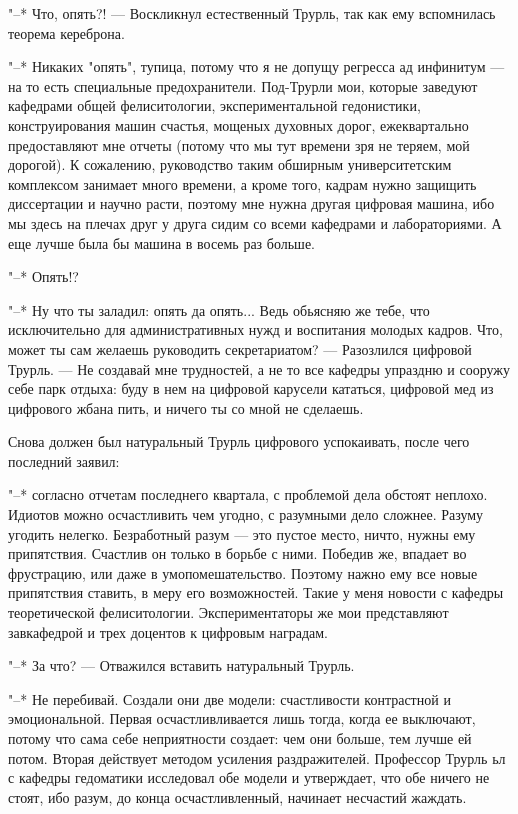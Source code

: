 "--* Что, опять?! --- Воскликнул естественный Трурль, так
как ему вспомнилась теорема кереброна.

"--* Никаких "опять", тупица, потому что я не допущу
регресса ад инфинитум --- на то есть специальные
предохранители. Под-Трурли мои, которые заведуют кафедрами
общей фелиситологии, экспериментальной гедонистики,
конструирования машин счастья, мощеных духовных дорог,
ежеквартально предоставляют мне отчеты (потому что мы тут
времени зря не теряем, мой дорогой). К сожалению,
руководство таким обширным университетским комплексом
занимает много времени, а кроме того, кадрам нужно защищить
диссертации и научно расти, поэтому мне нужна другая
цифровая машина, ибо мы здесь на плечах друг у друга сидим
со всеми кафедрами и лабораториями. А еще лучше была бы
машина в восемь раз больше.

"--* Опять!?

"--* Ну что ты заладил: опять да опять... Ведь обьясняю же
тебе, что исключительно для административных нужд и
воспитания молодых кадров. Что, может ты сам желаешь
руководить секретариатом? --- Разозлился цифровой Трурль. --- Не
создавай мне трудностей, а не то все кафедры упраздню и
сооружу себе парк отдыха: буду в нем на цифровой карусели
кататься, цифровой мед из цифрового жбана пить, и ничего ты
со мной не сделаешь.

Снова должен был натуральный Трурль цифрового
успокаивать, после чего последний заявил:

"--* согласно отчетам последнего квартала, с проблемой дела
обстоят неплохо. Идиотов можно осчастливить чем угодно, с
разумными дело сложнее. Разуму угодить нелегко. Безработный
разум --- это пустое место, ничто, нужны ему припятствия.
Счастлив он только в борьбе с ними. Победив же, впадает во
фрустрацию, или даже в умопомешательство. Поэтому нажно ему
все новые припятствия ставить, в меру его возможностей.
Такие у меня новости с кафедры теоретической фелиситологии.
Экспериментаторы же мои представляют завкафедрой и трех
доцентов к цифровым наградам.

"--* За что? --- Отважился вставить натуральный Трурль.

"--* Не перебивай. Создали они две модели: счастливости
контрастной и эмоциональной. Первая осчастливливается лишь
тогда, когда ее выключают, потому что сама себе неприятности
создает: чем они больше, тем лучше ей потом. Вторая
действует методом усиления раздражителей. Профессор Трурль
ьл с кафедры гедоматики исследовал обе модели и утверждает,
что обе ничего не стоят, ибо разум, до конца
осчастливленный, начинает несчастий жаждать.

